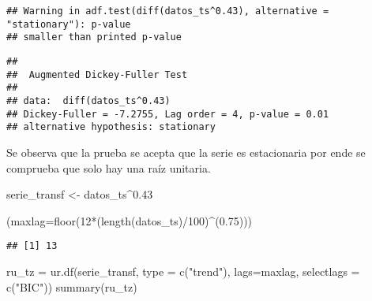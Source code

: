 \documentclass[
]{article}
\newenvironment{Shaded}{\begin{snugshade}}{\end{snugshade}}
\newcommand{\AttributeTok}[1]{\textcolor[rgb]{0.77,0.63,0.00}{#1}}
\newcommand{\DecValTok}[1]{\textcolor[rgb]{0.00,0.00,0.81}{#1}}
\newcommand{\FloatTok}[1]{\textcolor[rgb]{0.00,0.00,0.81}{#1}}
\newcommand{\FunctionTok}[1]{\textcolor[rgb]{0.00,0.00,0.00}{#1}}
\newcommand{\NormalTok}[1]{#1}
\newcommand{\OtherTok}[1]{\textcolor[rgb]{0.56,0.35,0.01}{#1}}
\newcommand{\SpecialCharTok}[1]{\textcolor[rgb]{0.00,0.00,0.00}{#1}}
\newcommand{\StringTok}[1]{\textcolor[rgb]{0.31,0.60,0.02}{#1}}
\begin{document}
\begin{verbatim}
## Warning in adf.test(diff(datos_ts^0.43), alternative = "stationary"): p-value
## smaller than printed p-value
\end{verbatim}

\begin{verbatim}
## 
##  Augmented Dickey-Fuller Test
## 
## data:  diff(datos_ts^0.43)
## Dickey-Fuller = -7.2755, Lag order = 4, p-value = 0.01
## alternative hypothesis: stationary
\end{verbatim}

Se observa que la prueba se acepta que la serie es estacionaria por ende
se comprueba que solo hay una raíz unitaria.

\begin{Shaded}
\begin{Highlighting}[]
\NormalTok{serie\_transf }\OtherTok{\textless{}{-}}\NormalTok{ datos\_ts}\SpecialCharTok{\^{}}\FloatTok{0.43}

\NormalTok{(}\AttributeTok{maxlag=}\FunctionTok{floor}\NormalTok{(}\DecValTok{12}\SpecialCharTok{*}\NormalTok{(}\FunctionTok{length}\NormalTok{(datos\_ts)}\SpecialCharTok{/}\DecValTok{100}\NormalTok{)}\SpecialCharTok{\^{}}\NormalTok{(}\FloatTok{0.75}\NormalTok{)))}
\end{Highlighting}
\end{Shaded}

\begin{verbatim}
## [1] 13
\end{verbatim}

\begin{Shaded}
\begin{Highlighting}[]
\NormalTok{ru\_tz }\OtherTok{=} \FunctionTok{ur.df}\NormalTok{(serie\_transf, }\AttributeTok{type =} \FunctionTok{c}\NormalTok{(}\StringTok{"trend"}\NormalTok{), }\AttributeTok{lags=}\NormalTok{maxlag, }\AttributeTok{selectlags =} \FunctionTok{c}\NormalTok{(}\StringTok{"BIC"}\NormalTok{))}
\FunctionTok{summary}\NormalTok{(ru\_tz)}
\end{Highlighting}
\end{Shaded}
\end{document}
